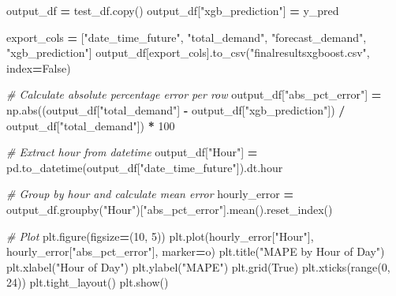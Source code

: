 \documentclass[mstat,12pt]{unswthesis}
\newenvironment{Shaded}{\begin{snugshade}}{\end{snugshade}}
\newcommand{\BuiltInTok}[1]{#1}
\newcommand{\CommentTok}[1]{\textcolor[rgb]{0.56,0.35,0.01}{\textit{#1}}}
\newcommand{\DecValTok}[1]{\textcolor[rgb]{0.00,0.00,0.81}{#1}}
\newcommand{\NormalTok}[1]{#1}
\newcommand{\OperatorTok}[1]{\textcolor[rgb]{0.81,0.36,0.00}{\textbf{#1}}}
\newcommand{\StringTok}[1]{\textcolor[rgb]{0.31,0.60,0.02}{#1}}
\newcommand{\VariableTok}[1]{\textcolor[rgb]{0.00,0.00,0.00}{#1}}
\begin{document}
\begin{Shaded}
\begin{Highlighting}[]
\NormalTok{output\_df }\OperatorTok{=}\NormalTok{ test\_df.copy()}
\NormalTok{output\_df[}\StringTok{"xgb\_prediction"}\NormalTok{] }\OperatorTok{=}\NormalTok{ y\_pred}

\NormalTok{export\_cols }\OperatorTok{=}\NormalTok{ [}\StringTok{"date\_time\_future"}\NormalTok{, }\StringTok{"total\_demand"}\NormalTok{, }
    \StringTok{"forecast\_demand"}\NormalTok{, }\StringTok{"xgb\_prediction"}\NormalTok{]}
\NormalTok{output\_df[export\_cols].to\_csv(}\StringTok{"finalresultsxgboost.csv"}\NormalTok{, index}\OperatorTok{=}\VariableTok{False}\NormalTok{)}


\CommentTok{\# Calculate absolute percentage error per row}
\NormalTok{output\_df[}\StringTok{"abs\_pct\_error"}\NormalTok{] }\OperatorTok{=}\NormalTok{ np.}\BuiltInTok{abs}\NormalTok{((output\_df[}\StringTok{"total\_demand"}\NormalTok{] }\OperatorTok{{-}} 
\NormalTok{    output\_df[}\StringTok{"xgb\_prediction"}\NormalTok{]) }\OperatorTok{/}\NormalTok{ output\_df[}\StringTok{"total\_demand"}\NormalTok{]) }\OperatorTok{*} \DecValTok{100}

\CommentTok{\# Extract hour from datetime}
\NormalTok{output\_df[}\StringTok{"Hour"}\NormalTok{] }\OperatorTok{=}\NormalTok{ pd.to\_datetime(output\_df[}\StringTok{"date\_time\_future"}\NormalTok{]).dt.hour}

\CommentTok{\# Group by hour and calculate mean error}
\NormalTok{hourly\_error }\OperatorTok{=} 
\NormalTok{    output\_df.groupby(}\StringTok{"Hour"}\NormalTok{)[}\StringTok{"abs\_pct\_error"}\NormalTok{].mean().reset\_index()}

\CommentTok{\# Plot}
\NormalTok{plt.figure(figsize}\OperatorTok{=}\NormalTok{(}\DecValTok{10}\NormalTok{, }\DecValTok{5}\NormalTok{))}
\NormalTok{plt.plot(hourly\_error[}\StringTok{"Hour"}\NormalTok{], hourly\_error[}\StringTok{"abs\_pct\_error"}\NormalTok{], marker}\OperatorTok{=}\StringTok{\textquotesingle{}o\textquotesingle{}}\NormalTok{)}
\NormalTok{plt.title(}\StringTok{"MAPE by Hour of Day"}\NormalTok{)}
\NormalTok{plt.xlabel(}\StringTok{"Hour of Day"}\NormalTok{)}
\NormalTok{plt.ylabel(}\StringTok{"MAPE"}\NormalTok{)}
\NormalTok{plt.grid(}\VariableTok{True}\NormalTok{)}
\NormalTok{plt.xticks(}\BuiltInTok{range}\NormalTok{(}\DecValTok{0}\NormalTok{, }\DecValTok{24}\NormalTok{))}
\NormalTok{plt.tight\_layout()}
\NormalTok{plt.show()}
\end{Highlighting}
\end{Shaded}
\end{document}
